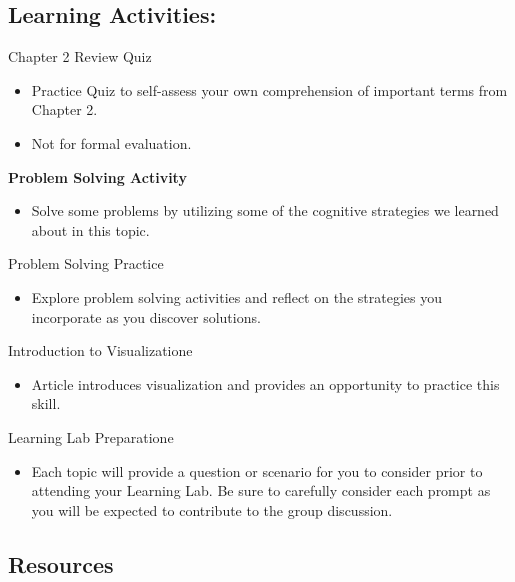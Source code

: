 \documentclass[
]{book}
\providecommand{\tightlist}{%
  \setlength{\itemsep}{0pt}\setlength{\parskip}{0pt}}
\begin{document}
\hypertarget{learning-activities}{%
\subsection*{Learning Activities:}\label{learning-activities}}

\begin{reflect}
{Chapter 2 Review Quiz}

\begin{itemize}
\tightlist
\item
  Practice Quiz to self-assess your own comprehension of important terms from Chapter 2.\\
\item
  Not for formal evaluation.
\end{itemize}

\textbf{Problem Solving Activity}

\begin{itemize}
\tightlist
\item
  Solve some problems by utilizing some of the cognitive strategies we learned about in this topic.
\end{itemize}

{Problem Solving Practice}

\begin{itemize}
\tightlist
\item
  Explore problem solving activities and reflect on the strategies you incorporate as you discover solutions.
\end{itemize}

{Introduction to Visualizatione}

\begin{itemize}
\tightlist
\item
  Article introduces visualization and provides an opportunity to practice this skill.
\end{itemize}

{Learning Lab Preparatione}

\begin{itemize}
\tightlist
\item
  Each topic will provide a question or scenario for you to consider prior to attending your Learning Lab. Be sure to carefully consider each prompt as you will be expected to contribute to the group discussion.
\end{itemize}
\end{reflect}

\hypertarget{resources}{%
\subsection*{Resources}\label{resources}}
\end{document}
